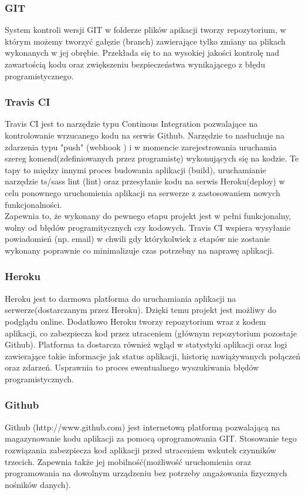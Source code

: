 \documentclass[eng,printmode]{mgr}
\begin{document}
\subsubsection{GIT}
System kontroli wersji GIT \cite {GIT} w folderze plików apikacji tworzy repozytorium, w którym możemy tworzyć gałęzie (branch) zawierające tylko zmiany na plikach wykonanych w jej obrębie. Przekłada się to na wysokiej jakości kontrolę nad zawartością kodu oraz zwiększeniu bezpieczeństwa wynikającego z błędu programistycznego. 

\subsubsection{Travis CI}
Travis CI \cite {TRAVIS} jest to narzędzie typu Continous Integration \cite {CI} pozwalające na kontrolowanie wrzucanego kodu na serwis Github. Narzędzie to nasłuchuje na zdarzenia typu "push" (webhook \cite {webhook}) i w momencie zarejestrowania uruchamia szereg komend(zdefiniowanych przez programistę) wykonujących się na kodzie. Te tapy to między innymi proces budowania aplikacji (build), uruchamianie narzędzie ts/sass lint (lint) oraz przesyłanie kodu na serwis Heroku(deploy) w celu ponownego uruchomienia aplikacji na serwerze z zastosowaniem nowych funkcjonalności. \\
Zapewnia to, że wykonany do pewnego etapu projekt jest w pełni funkcjonalny, wolny od błędów programitycznych czy kodowych. Travis CI wspiera wysyłanie powiadomień (np. email) w chwili gdy którykolwiek z etapów nie zostanie wykonany poprawnie co minimalizuje czas potrzebny na naprawę aplikacji.

\subsubsection{Heroku}
Heroku \cite{Heroku} jest to darmowa platforma do uruchamiania aplikacji na serwerze(dostarczanym przez Heroku). Dzięki temu projekt jest możliwy do podglądu online. Dodatkowo Heroku tworzy repozytorium wraz z kodem aplikacji, co zabezpiecza kod przez utraceniem (głównym repozytorium pozostaje Github). Platforma ta dostarcza również wgląd w statystyki aplikacji oraz logi zawierające takie informacje jak status aplikacji, historię nawiążywanych połączeń oraz zdarzeń. Usprawnia to proces ewentualnego wyszukiwania błędów programistycznych.

\subsubsection{Github}
Github (http://www.github.com) jest internetową platformą pozwalającą na magazynowanie kodu aplikacji za pomocą oprogramowania GIT. Stosowanie tego rozwiązania zabezpiecza kod aplikacji przed utraceniem wskutek czynników trzecich. Zapewnia także jej mobilność(możliwość uruchomienia oraz programowania na dowolnym urządzeniu bez potrzeby angażowania fizycznych nośników danych).
\end{document}
